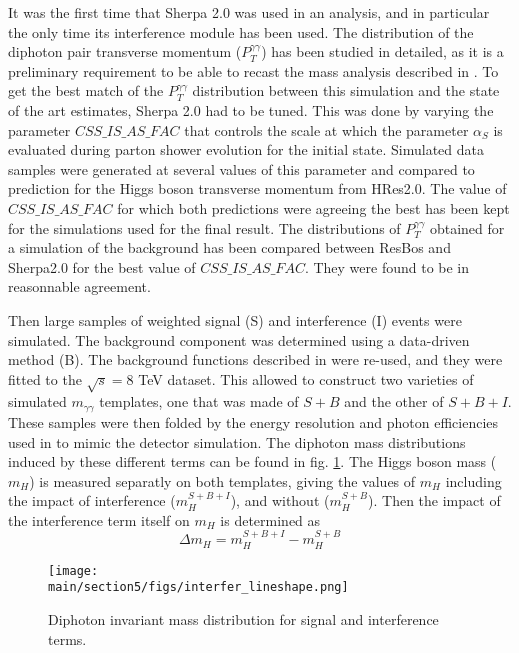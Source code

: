It was the first time that Sherpa 2.0 was used in an analysis, and in particular the only time its interference module has been used. The distribution of the diphoton pair transverse momentum ($P_T^{\gamma\gamma}$) has been studied in detailed, as it is a preliminary requirement to be able to recast the mass analysis described in \cite{Aad:2014aba}. To get the best match of the $P_T^{\gamma\gamma}$ distribution between this simulation and the state of the art estimates, Sherpa 2.0 had to be tuned. This was done by varying the parameter $CSS\_IS\_AS\_FAC$ that controls the scale at which the parameter $\alpha_S$ is evaluated during parton shower evolution for the initial state. Simulated data samples were generated at several values of this parameter and compared to prediction for the Higgs boson transverse momentum from HRes2.0. The value of $CSS\_IS\_AS\_FAC$ for which both predictions were agreeing the best has been kept for the simulations used for the final result. The distributions of $P_T^{\gamma\gamma}$ obtained for a simulation of the background has been compared between ResBos and Sherpa2.0 for the best value of $CSS\_IS\_AS\_FAC$. They were found to be in reasonnable agreement.

Then large samples of weighted signal (S) and interference (I) events were simulated. The background component was determined using a data-driven method (B). The background functions described in \cite{Aad:2014aba} were re-used, and they were fitted to the $\sqrt{s} = 8$ TeV dataset. This allowed to construct two varieties of simulated $m_{\gamma\gamma}$ templates, one that was made of $S+B$ and the other of $S+B+I$. These samples were then folded by the energy resolution and photon efficiencies used in \cite{Aad:2014aba} to mimic the detector simulation. The diphoton mass distributions induced by these different terms can be found in fig. \ref{fig:interfer_lineshape}. The Higgs boson mass ($m_H$) is measured separatly on both templates, giving the values of $m_H$ including the impact of interference ($m_H^{S+B+I}$), and without ($m_H^{S+B}$). Then the impact of the interference term itself on $m_H$ is determined as \begin{equation}
    \Delta m_H = m_H^{S+B+I}-m_H^{S+B}
\end{equation}

\begin{figure}
    \centering
    \texttt{[image: \\main/section5/figs/interfer\_lineshape.png]}
    \caption{Diphoton invariant mass distribution for signal and interference terms.}
    \label{fig:interfer_lineshape}
\end{figure}

